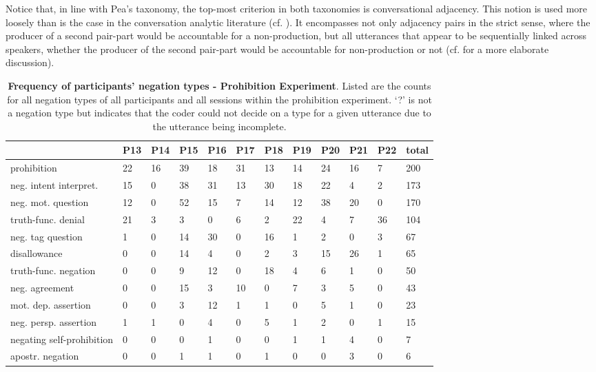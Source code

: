 \begin{screenonly}
Notice that, in line with Pea's taxonomy, the top-most criterion in both taxonomies is conversational adjacency. This notion is used more loosely than
is the case in the conversation analytic literature (cf. \cite{Hutchby1999}). It encompasses not only adjacency pairs in the strict sense, where the producer
of a second pair-part would be accountable for a non-production, but all utterances that appear to be sequentially linked across speakers, whether the producer
of the second pair-part would be accountable for non-production or not (cf. \cite{Foerster2013} for a more elaborate discussion).

\begin{table*}[h]
  \caption{\textbf{Frequency of participants' negation types - Prohibition Experiment}. Listed are the counts for all negation types of all
    participants and all sessions within the prohibition experiment. `?' is not a negation type but indicates that the coder could not decide
    on a type for a given utterance due to the utterance being incomplete.}
  \label{tbl_freq_neg_types_pro}
  \begin{tabular*}{\hsize}{@{\extracolsep{\fill}}llllllllllll}
    \toprule
    & P13 & P14 & P15 & P16 & P17 & P18 & P19 & P20 & P21 & P22 & total\\
    \midrule
    prohibition & 22 & 16 & 39 & 18 & 31 & 13 & 14 & 24 & 16 & 7 & 200\\
    neg. intent interpret. & 15 & 0 & 38 & 31 & 13 & 30 & 18 & 22 & 4 & 2 & 173\\
    neg. mot. question & 12 & 0 & 52 & 15 & 7 & 14 & 12 & 38 & 20 & 0 & 170\\
    truth-func. denial & 21 & 3 & 3 & 0 & 6 & 2 & 22 & 4 & 7 & 36 & 104\\
    neg. tag question & 1 & 0 & 14 & 30 & 0 & 16 & 1 & 2 & 0 & 3 & 67\\
    disallowance & 0 & 0 & 14 & 4 & 0 & 2 & 3 & 15 & 26 & 1 & 65\\
    truth-func. negation & 0 & 0 & 9 & 12 & 0 & 18 & 4 & 6 & 1 & 0 & 50\\
    neg. agreement & 0 & 0 & 15 & 3 & 10 & 0 & 7 & 3 & 5 & 0 & 43\\
    mot. dep. assertion & 0 & 0 & 3 & 12 & 1 & 1 & 0 & 5 & 1 & 0 & 23\\
    neg. persp. assertion & 1 & 1 & 0 & 4 & 0 & 5 & 1 & 2 & 0 & 1 & 15\\
    negating self-prohibition & 0 & 0 & 0 & 1 & 0 & 0 & 1 & 1 & 4 & 0 & 7\\
    apostr. negation & 0 & 0 & 1 & 1 & 0 & 1 & 0 & 0 & 3 & 0 & 6\\

\end{tabular*}
\end{table*}
\end{screenonly}
